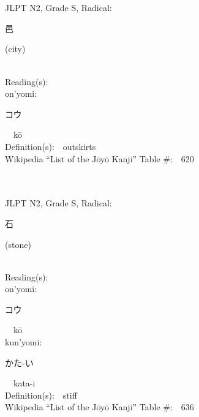 \begin{multicols}{2}
\ \ \\
{\fontsize{34pt}{40pt}  }\ \ \\  %
{JLPT N2, Grade S, Radical:\ \ {\begin{CJK}{UTF8}{min} 邑 \end{CJK}} (city) } \\
Reading(s):\ \ \\
{\hspace*{1em}}on'yomi:\ \ \\
{\hspace*{2em}}{\begin{CJK}{UTF8}{min} コウ \end{CJK}}\ \ k\=o\ \ \\
Definition(s):\ \ outskirts \\
Wikipedia ``List of the J\=oy\=o Kanji'' Table \#:\ \ 620 \\
\ \ \\
{\fontsize{34pt}{40pt}  }\ \ \\  %
{JLPT N2, Grade S, Radical:\ \ {\begin{CJK}{UTF8}{min} 石 \end{CJK}} (stone) } \\
Reading(s):\ \ \\
{\hspace*{1em}}on'yomi:\ \ \\
{\hspace*{2em}}{\begin{CJK}{UTF8}{min} コウ \end{CJK}}\ \ k\=o\ \ \\
{\hspace*{1em}}kun'yomi:\ \ \\
{\hspace*{2em}}{\begin{CJK}{UTF8}{min} かた-い \end{CJK}}\ \ kata-i\ \ \\
Definition(s):\ \ stiff \\
Wikipedia ``List of the J\=oy\=o Kanji'' Table \#:\ \ 636 \\
\ \ \\
{\fontsize{34pt}{40pt}  }\ \ \\  %

\end{multicols}
